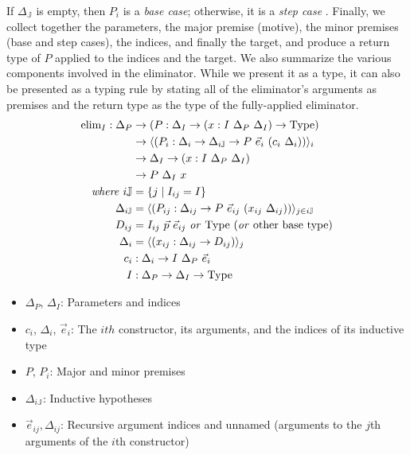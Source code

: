 \documentclass{report}
\newcommand{\const}[1]{\text{#1}}
\newcommand{\Type}{\const{Type}}
\begin{document}
If $\Delta_{\mathbb{J}}$ is empty, then $P_i$ is a \emph{base case}; otherwise, it is a \emph{step case} \citep{inductive-families}. Finally, we collect together the parameters, the major premise (motive), the minor premises (base and step cases), the indices, and finally the target, and produce a return type of $P$ applied to the indices and the target. We also summarize the various components involved in the eliminator. While we present it as a type, it can also be presented as a typing rule by stating all of the eliminator's arguments as premises and the return type as the type of the fully-applied eliminator.
%
\begin{align*}
    \const{elim}_I : \Delta_P &\to (P : \Delta_I \to (x : I ~ \Delta_P ~ \Delta_I) \to \Type) \\
    &\to \langle (P_i: \Delta_i \to \Delta_{i\mathbb{J}} \to P ~ \Vec{e}_i ~ (c_i ~ \Delta_i)) \rangle_i \\
    &\to \Delta_I \to (x: I ~ \Delta_P ~ \Delta_I) \\
    &\to P ~ \Delta_I ~ x \\
    \text{\emph{where}} ~ i\mathbb{J} &= \{ j \mid I_{ij} = I \} \\
    \Delta_{i\mathbb{J}} &= \langle (P_{ij} : \Delta_{ij} \to P ~ \Vec{e}_{ij} ~ (x_{ij} ~ \Delta_{ij})) \rangle_{j \in i\mathbb{J}} \\
    D_{ij} &= I_{ij} ~ \Vec{p} ~ \Vec{e}_{ij} ~ \text{\emph{or}} ~ \Type ~ (\text{\emph{or} other base type})\\
    \Delta_i &= \langle (x_{ij} : \Delta_{ij} \to D_{ij}) \rangle_j \\
    c_i &: \Delta_i \to I ~ \Delta_P ~ \Vec{e}_i \\
    I &: \Delta_P \to \Delta_I \to \Type
\end{align*}
%
\begin{itemize}
    \item $\Delta_P$, $\Delta_I$: Parameters and indices
    \item $c_i$, $\Delta_i$, $\Vec{e}_i$: The $ith$ constructor, its arguments, and the indices of its inductive type
    \item $P$, $P_i$: Major and minor premises
    \item $\Delta_{i\mathbb{J}}$: Inductive hypotheses
    \item $\Vec{e}_{ij}, \Delta_{ij}$: Recursive argument indices and unnamed (arguments to the $j$th arguments of the $i$th constructor)
\end{itemize}
\end{document}
